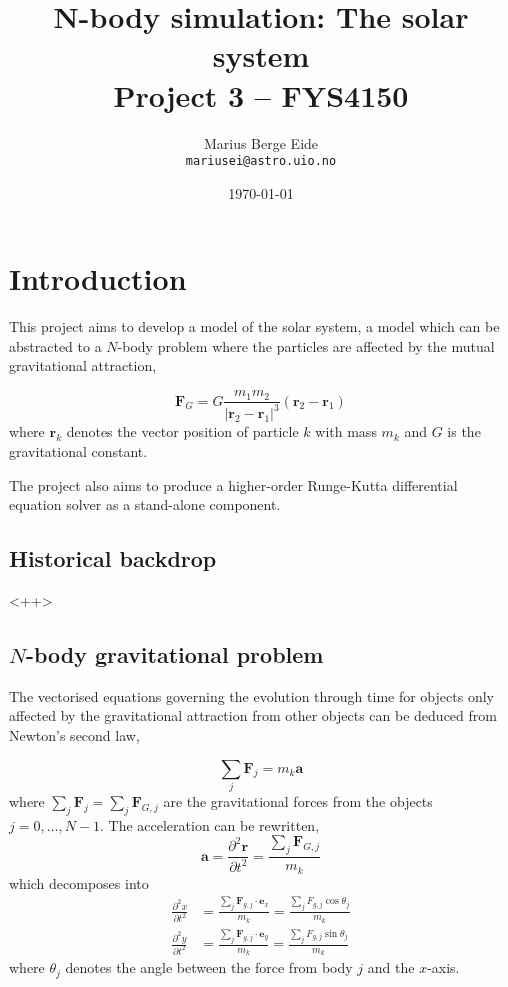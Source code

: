 \documentclass[a4paper,11pt]{article}
\date{\today}
\title{N-body simulation: The solar system\\ \small{Project 3 -- FYS4150}}
\author{Marius Berge Eide \\
\texttt{mariusei@astro.uio.no}}
\begin{document}
\onecolumn
\maketitle{}

\begin{abstract}
\end{abstract}

\section{Introduction}
This project aims to develop a model of the solar system, a model which can be abstracted to a $N$-body problem where the particles are affected by the mutual gravitational attraction,

\begin{equation}
    \mathbf{F}_G = G \frac{m_1 m_2}{|\mathbf{r}_2 - \mathbf{r}_1|^3} \left( \mathbf{r}_2 - \mathbf{r}_1  \right)
    \label{eq:gravity}
\end{equation}
where $\mathbf{r}_k$ denotes the vector position of particle $k$ with mass $m_k$ and $G$ is the gravitational constant. 

The project also aims to produce a higher-order Runge-Kutta differential equation solver as a stand-alone component. 

\subsection{Historical backdrop}<++>

\subsection{$N$-body gravitational problem}
The vectorised equations governing the evolution through time for objects only affected by the gravitational attraction from other objects can be deduced from Newton's second law,

\begin{equation}
    \sum_j \mathbf{F}_j = m_k \mathbf{a}
    \label{eq:N2L}
\end{equation}
where $\sum_j \mathbf{F}_j = \sum_j \mathbf{F}_{G,j}$ are the gravitational forces from the objects $j=0,\dots,N-1$. The acceleration can be rewritten,
\[ \mathbf{a} = \frac{\partial^2 \mathbf{r}}{\partial t^2} = \frac{\sum_j \mathbf{F}_{G,j}}{m_k} \]
which decomposes into
\begin{align}
    \frac{\partial^2 x}{\partial t^2} &= \frac{\sum_j \mathbf{F}_{g,j} \cdot \mathbf{e}_x}{m_k} = \frac{\sum_j F_{g,j} \cos \theta_j}{m_k} 
    \label{eq:diffx} \\
    \frac{\partial^2 y}{\partial t^2} &= \frac{\sum_j \mathbf{F}_{g,j} \cdot \mathbf{e}_y}{m_k} = \frac{\sum_j F_{g,j} \sin \theta_j }{m_k}
    \label{eq:diffy}
\end{align}
where $\theta_j$ denotes the angle between the force from body $j$ and the $x$-axis.
\end{document}
